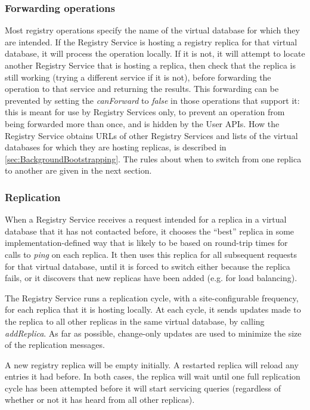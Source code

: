 \subsubsection{Forwarding operations}\label{sec:RegistryForwarding}

Most registry operations specify the name of the virtual database for
which they are intended. If the Registry Service is hosting a registry
replica for that virtual database, it will process the operation
locally. If it is not, it will attempt to locate another Registry
Service that is hosting a replica, then check that the replica is
still working (trying a different service if it is not), before
forwarding the operation to that service and returning the
results. This forwarding can be prevented by setting the
\textit{canForward} to \textit{false} in those operations that support
it: this is meant for use by Registry Services only, to prevent an
operation from being forwarded more than once, and is hidden by the
User APIs. How the Registry Service obtains URLs of other Registry
Services and lists of the virtual databases for which they are hosting
replicas, is described in \ref{sec:BackgroundBootstrapping}. The rules
about when to switch from one replica to another are given in the next
section.

\subsubsection{Replication}\label{sec:RegistryReplication}

When a Registry Service receives a request intended for a replica in a
virtual database that it has not contacted before, it chooses the
``best'' replica in some implementation-defined way that is likely to
be based on round-trip times for calls to \textit{ping} on each
replica. It then uses this replica for all subsequent requests for
that virtual database, until it is forced to switch either because the
replica fails, or it discovers that new replicas have been added
(e.g. for load balancing).

The Registry Service runs a replication cycle, with a
site-configurable frequency, for each replica that it is hosting
locally. At each cycle, it sends updates made to the replica to all
other replicas in the same virtual database, by calling
\textit{addReplica}. As far as possible, change-only updates are used
to minimize the size of the replication messages.

A new registry replica will be empty initially. A restarted replica
will reload any entries it had before. In both cases, the replica will
wait until one full replication cycle has been attempted before it
will start servicing queries (regardless of whether or not it has
heard from all other replicas).

